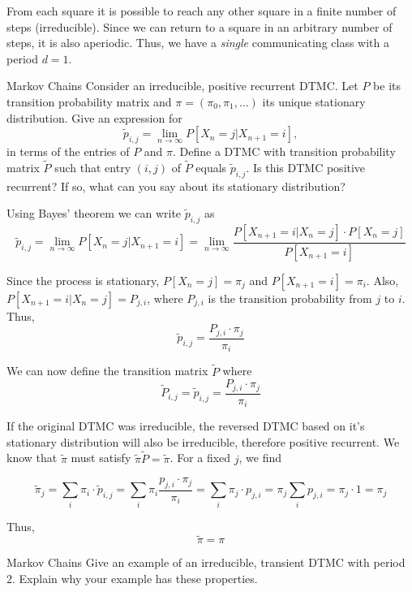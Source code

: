 \begin{solution}
  From each square it is possible to reach any other square in a finite number of steps (irreducible). Since we can return to a square in an arbitrary number of steps, it is also aperiodic. Thus, we have a \textit{single} communicating class with a period $d=1$.
\end{solution}

\begin{problem}{Markov Chains}
Consider an irreducible, positive recurrent DTMC. Let \( P \) be its transition probability matrix and \( \pi = (\pi_0, \pi_1, \ldots) \) its unique stationary distribution. Give an expression for
\[
\tilde{p}_{i,j} = \lim_{n \to \infty} P[X_n = j | X_{n+1} = i],
\]
in terms of the entries of \( P \) and \( \pi \). Define a DTMC with transition probability matrix \( \tilde{P} \) such that entry \( (i, j) \) of \( \tilde{P} \) equals \( \tilde{p}_{i,j} \). Is this DTMC positive recurrent? If so, what can you say about its stationary distribution?
\end{problem}

\begin{solution}
  Using Bayes' theorem we can write $\tilde{p}_{i,j}$ as
  \[
    \tilde{p}_{i,j} = \lim_{n \to \infty} P[X_n = j | X_{n+1} = i] = \lim_{n \to \infty} \frac{P[X_{n+1}=i | X_n = j] \cdot P[X_n=j]}{P[X_{n+1}=i]}
  \]

  Since the process is stationary, $P[X_n=j] = \pi_j$ and $P[X_{n+1}=i] = \pi_i$. Also, $P[X_{n+1}=i | X_n = j] = P_{j,i}$, where $P_{j,i}$ is the transition probability from $j$ to $i$. Thus,
  \[
    \tilde{p}_{i,j} = \frac{P_{j,i}\cdot \pi_j}{\pi_i}
  \]

  We can now define the transition matrix $\tilde{P}$ where 
  \[
    \tilde{P}_{i,j}=\tilde{p}_{i,j} = \frac{P_{j,i}\cdot \pi_j}{\pi_i}
  \]

  If the original DTMC was irreducible, the reversed DTMC based on it's stationary distribution will also be irreducible, therefore positive recurrent.
  We know that $\tilde{\pi}$ must satisfy $\tilde{\pi}\tilde{P} = \tilde{\pi}$. For a fixed $j$, we find

  \[
    \tilde{\pi}_j = \sum_i\pi_i\cdot\tilde{p}_{i,j} = \sum_i\pi_i\frac{p_{j,i}\cdot \pi_j}{\pi_i}=\sum_i\pi_j\cdot  p_{j,i}= \pi_j\sum_ip_{j,i} = \pi_j \cdot 1 = \pi_j
  \]

  Thus,
  \[
    \boxed{\tilde{\pi} = \pi}
  \]
\end{solution}

\begin{problem}{Markov Chains}
Give an example of an irreducible, transient DTMC with period 2. Explain why your example has these properties.
\end{problem}

